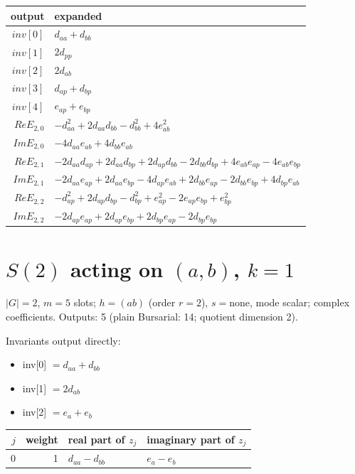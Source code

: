 \documentclass[10pt]{article}
\begin{document}
\begin{longtable}{r>{\raggedright\arraybackslash}p{}}
output & expanded \\ \hline
$inv[0]$ & $d_{aa} + d_{bb}$ \\
$inv[1]$ & $2 d_{pp}$ \\
$inv[2]$ & $2 d_{ab}$ \\
$inv[3]$ & $d_{ap} + d_{bp}$ \\
$inv[4]$ & $e_{ap} + e_{bp}$ \\
$Re E_{2,0}$ & $- d_{aa}^{2} + 2 d_{aa} d_{bb} - d_{bb}^{2} + 4 e_{ab}^{2}$ \\
$Im E_{2,0}$ & $- 4 d_{aa} e_{ab} + 4 d_{bb} e_{ab}$ \\
$Re E_{2,1}$ & $- 2 d_{aa} d_{ap} + 2 d_{aa} d_{bp} + 2 d_{ap} d_{bb} - 2 d_{bb} d_{bp} + 4 e_{ab} e_{ap} - 4 e_{ab} e_{bp}$ \\
$Im E_{2,1}$ & $- 2 d_{aa} e_{ap} + 2 d_{aa} e_{bp} - 4 d_{ap} e_{ab} + 2 d_{bb} e_{ap} - 2 d_{bb} e_{bp} + 4 d_{bp} e_{ab}$ \\
$Re E_{2,2}$ & $- d_{ap}^{2} + 2 d_{ap} d_{bp} - d_{bp}^{2} + e_{ap}^{2} - 2 e_{ap} e_{bp} + e_{bp}^{2}$ \\
$Im E_{2,2}$ & $- 2 d_{ap} e_{ap} + 2 d_{ap} e_{bp} + 2 d_{bp} e_{ap} - 2 d_{bp} e_{bp}$ \\
\end{longtable}

\clearpage
\section{$S(2)$ acting on $(a, b)$, $k = 1$}
$|G| = 2$, $m = 5$ slots; $h = (a b)$ (order $r = 2$), $s = \text{none}$, mode scalar; complex coefficients. Outputs: 5 (plain Bursarial: 14; quotient dimension 2).

Invariants output directly:
\begin{itemize}
  \item inv[0] $= d_{aa} + d_{bb}$
  \item inv[1] $= 2 d_{ab}$
  \item inv[2] $= e_{a} + e_{b}$
\end{itemize}

\begin{longtable}{rr>{\raggedright\arraybackslash}p{}>{\raggedright\arraybackslash}p{}}
$j$ & weight & real part of $z_j$ & imaginary part of $z_j$ \\ \hline
0 & 1 & $d_{aa} - d_{bb}$ & $e_{a} - e_{b}$ \\
\end{longtable}
\end{document}
